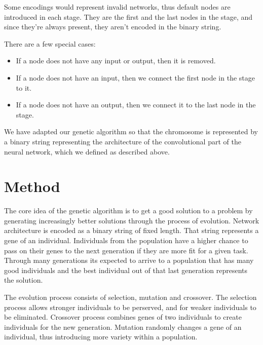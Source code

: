 \documentclass[eng]{simposium}
\begin{document}
Some encodings would represent invalid networks, thus default nodes are introduced in each stage.
They are the first and the last nodes in the stage, and since they're always present, they aren't encoded in the binary string.

There are a few special cases:
\begin{itemize}
    \item If a node does not have any input or output, then it is removed.
    \item If a node does not have an input, then we connect the first node in the stage to it.
    \item If a node does not have an output, then we connect it to the last node in the stage.
\end{itemize}

We have adapted our genetic algorithm so that the chromosome is represented by a binary string representing 
the architecture of the convolutional part of the neural network, which we defined as described above. 

\section{Method}

The core idea of the genetic algorithm is to get a good solution to a problem by generating increasingly better solutions through the process of evolution.
Network architecture is encoded as a binary string of fixed length. That string represents a gene of an individual.
Individuals from the population have a higher chance to pass on their genes to the next generation if they are more fit for a given task.
Through many generations its expected to arrive to a population that has many good individuals and the best individual out of that last generation represents the solution.

The evolution process consists of selection, mutation and crossover. 
The selection process allows stronger individuals to be perserved, and for weaker individuals to be eliminated.
Crossover process combines genes of two individuals to create individuals for the new generation.
Mutation randomly changes a gene of an individual, thus introducing more variety within a population.
\end{document}
